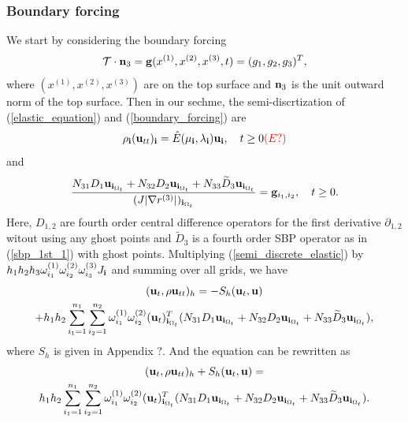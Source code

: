 \documentclass[a4paper]{article}
\newcommand{\wt}{\widetilde}
\begin{document}
\subsubsection{Boundary forcing}
We start by considering the boundary forcing
\begin{equation}\label{boundary_forcing}
\mathcal{T}\cdot{\bf n}_3 = {\bf g}(x^{(1)},x^{(2)},x^{(3)},t) = (g_1,g_2,g_3)^T,
\end{equation}
where $(x^{(1)},x^{(2)},x^{(3)})$ are on the top surface and ${\bf n}_3$ is the unit outward norm of the top surface. Then in our sechme, the semi-discrtization of (\ref{elastic_equation}) and (\ref{boundary_forcing}) are
\begin{equation}\label{semi_discrete_elastic}
\rho_{\bf i}({\bf u}_{tt})_{\bf i} = \hat{E}(\mu_{\bf i},\lambda_{\bf i}){\bf u}_{\bf i}, \ \ \ t\geq0  {\color{red}(E?)}
\end{equation}
and
\begin{equation}\label{discrete_boundary_forcing}
\frac{N_{31} D_1 {\bf u}_{{\bf i}_{\Omega_t}} + N_{32} D_2 {\bf u}_{{\bf i}_{\Omega_t}} + N_{33} \wt{D}_3 {\bf u}_{{\bf i}_{\Omega_t}}}{(J|\nabla r^{(3)}|)_{{\bf i}_{\Omega_t}}}  = {\bf g}_{i_1,i_2}, \ \ \ t\geq0.
\end{equation}
Here, $D_{1,2}$ are fourth order central difference operators for the first derivative $\partial_{1,2}$ witout using any ghost points and $\wt{D}_3$ is a fourth order SBP operator as in (\ref{sbp_1st_1}) with ghost points. Multiplying (\ref{semi_discrete_elastic}) by $h_1h_2h_3\omega_{i_1}^{(1)}\omega_{i_2}^{(2)}\omega_{i_3}^{(3)}J_{\bf i}$ and summing over all grids, we have
\begin{multline*}
({\bf u}_t,\rho{\bf u}_{tt})_h = -S_h({\bf u}_t,{\bf u}) \\
+ h_1h_2\sum_{i_1=1}^{n_1}\sum_{i_2=1}^{n_2}\omega_{i_1}^{(1)}\omega_{i_2}^{(2)}({\bf u}_t)_{{\bf i}_{\Omega_t}}^T(N_{31}D_1{\bf u}_{{\bf i}_{\Omega_t}} + N_{32}D_2{\bf u}_{{\bf i}_{\Omega_t}} +N_{33}\wt{D}_3{\bf u}_{{\bf i}_{\Omega_t}}),
\end{multline*}
where $S_h$ is given in Appendix ?. And the equation can be rewritten as
\begin{multline}\label{time_derivative_energy}
({\bf u}_t,\rho{\bf u}_{tt})_h + S_h({\bf u}_t,{\bf u}) = \\
h_1h_2\sum_{i_1=1}^{n_1}\sum_{i_2=1}^{n_2}\omega_{i_1}^{(1)}\omega_{i_2}^{(2)}({\bf u}_t)_{{\bf i}_{\Omega_t}}^T(N_{31}D_1{\bf u}_{{\bf i}_{\Omega_t}} + N_{32}D_2{\bf u}_{{\bf i}_{\Omega_t}} +N_{33}\wt{D}_3{\bf u}_{{\bf i}_{\Omega_t}}).
\end{multline}
\end{document}
